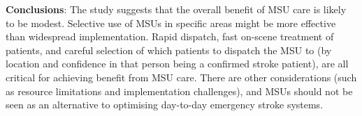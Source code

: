 \textbf{Conclusions}: The study suggests that the overall benefit of MSU care is likely to be modest. Selective use of MSUs in specific areas might be more effective than widespread implementation. Rapid dispatch, fast on-scene treatment of patients, and careful selection of which patients to dispatch the MSU to (by location and confidence in that person being a confirmed stroke patient), are all critical for achieving benefit from MSU care. There are other considerations (such as resource limitations and implementation challenges), and MSUs should not be seen as an alternative to optimising day-to-day emergency stroke systems.